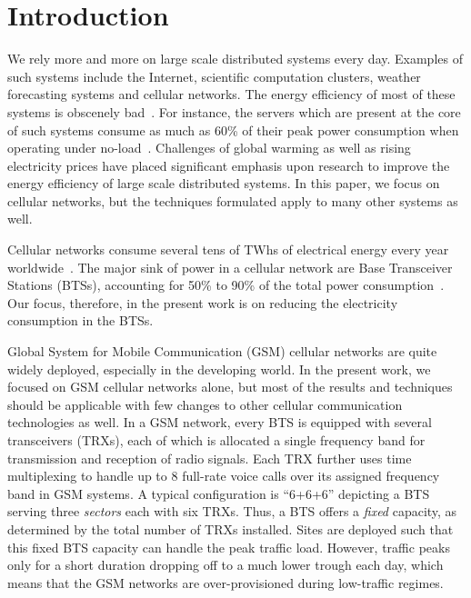 \section{Introduction}
\label{sec:intro} 
We rely more and more on large scale distributed systems every day. Examples of such systems include the Internet, scientific computation clusters, weather forecasting systems and cellular networks. The energy efficiency of most of these systems is obscenely bad~\cite{Jeyarani:2012:DIA:2148243.2148374,AlDaoud2012745,5621969}. For instance, the servers which are present at the core of such systems consume as much as 60\% of their peak power consumption when operating under no-load~\cite{10.1109/MC.2007.443}. Challenges of global warming as well as rising electricity prices have placed significant emphasis upon research to improve the energy efficiency of large scale distributed systems. In this paper, we focus on cellular networks, but the techniques formulated apply to many other systems as well.

Cellular networks consume several tens of TWhs of electrical energy
every year worldwide~\cite{Oh:Comm:2011}. The major sink of power in a cellular network are Base
Transceiver Stations (BTSs), accounting for 50\% to 90\% of
the total power
consumption~\cite{Louhi:2007:BTSPower:INTELEC,Oh:Comm:2011}. Our focus, therefore, in the present work is on reducing the electricity consumption in the BTSs.

Global System for Mobile Communication (GSM) cellular networks are quite widely deployed, especially in the developing world. In the present work, we focused on GSM cellular networks alone, but most of the results and techniques should be applicable with few changes to other cellular communication technologies as well. In a GSM network, every BTS is equipped with several transceivers (TRXs), each of
which is allocated a single frequency band for transmission and
reception of radio signals. Each TRX further uses time
multiplexing to handle up to 8 full-rate voice calls over its
assigned frequency band in GSM systems. A typical configuration
is ``6+6+6'' depicting a BTS serving three \textit{sectors}
each with six TRXs. Thus, a BTS offers a \textit{fixed} capacity, as
determined by the total number of TRXs installed. Sites are
deployed such that this fixed BTS capacity can handle the peak
traffic load. However, traffic peaks only for a short duration
dropping off to a much lower trough each day, which means that
the GSM networks are over-provisioned during
low-traffic regimes.

